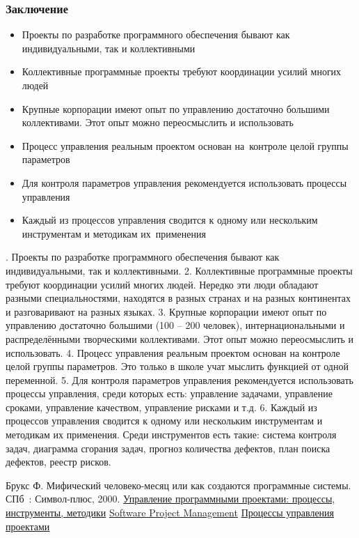 \documentclass{../industrial-development}
\begin{document}
\begin{frame} \frametitle{Заключение}
	\begin{itemize}
		\item Проекты по разработке программного обеспечения бывают как индивидуальными, так и коллективными
		\item Коллективные программные проекты требуют координации усилий многих людей
		\item Крупные корпорации имеют опыт по управлению достаточно большими коллективами. Этот опыт можно переосмыслить и использовать
		\item Процесс управления реальным проектом основан на~контроле целой группы параметров
		\item Для контроля параметров управления рекомендуется использовать процессы управления
		\item Каждый из процессов управления сводится к одному или нескольким инструментам и методикам их~применения
	\end{itemize}
\end{frame}
. Проекты по разработке программного обеспечения бывают как индивидуальными, так и коллективными.
2. Коллективные программные проекты требуют координации усилий многих людей. Нередко эти люди обладают разными специальностями, находятся в разных странах и на разных континентах и разговаривают на разных языках.
3. Крупные корпорации имеют опыт по управлению достаточно большими (100 – 200 человек), интернациональными и распределёнными творческими коллективами. Этот опыт можно переосмыслить и использовать.
4. Процесс управления реальным проектом основан на контроле целой группы параметров. Это только в школе учат мыслить функцией от одной переменной.
5. Для контроля параметров управления рекомендуется использовать процессы управления, среди которых есть: управление задачами, управление сроками, управление качеством, управление рисками и т.д.
6. Каждый из процессов управления сводится к одному или нескольким инструментам и методикам их применения. Среди инструментов есть такие: система контроля задач, диаграмма сгорания задач, прогноз количества дефектов, план поиска дефектов, реестр рисков.

\begin{thebibliography}{99}
 Брукс Ф. Мифический человеко-месяц или как создаются программные системы. СПб~: Символ-плюс, 2000.
 \href{https://habrahabr.ru/post/286896/}{Управление программными проектами: процессы, инструменты, методики}
 \href{https://www.tutorialspoint.com/software_engineering/software_project_management.htm}{Software Project Management}
 \href{https://pmpractice.ru/knowledgebase/managment/keypoints/process/}{Процессы управления проектами}
\end{thebibliography}
\end{document}
